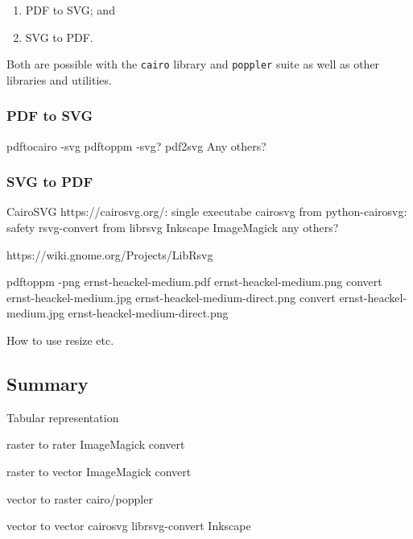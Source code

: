 \documentclass[
  11pt,
  british,
  a4paper,
]{article}
\newenvironment{Shaded}{\begin{snugshade}}{\end{snugshade}}
\newcommand{\AttributeTok}[1]{\textcolor[rgb]{0.80,0.80,0.80}{#1}}
\newcommand{\ExtensionTok}[1]{\textcolor[rgb]{0.80,0.80,0.80}{#1}}
\newcommand{\NormalTok}[1]{\textcolor[rgb]{0.80,0.80,0.80}{#1}}
\providecommand{\tightlist}{%
  \setlength{\itemsep}{0pt}\setlength{\parskip}{0pt}}
\begin{document}
\begin{enumerate}
\def\labelenumi{\alph{enumi}.}
\tightlist
\item
  PDF to SVG; and
\item
  SVG to PDF.
\end{enumerate}

Both are possible with the \texttt{cairo} library and \texttt{poppler}
suite as well as other libraries and utilities.

\hypertarget{pdf-to-svg}{%
\subsubsection{PDF to SVG}\label{pdf-to-svg}}

pdftocairo -svg pdftoppm -svg? pdf2svg Any others?

\hypertarget{svg-to-pdf}{%
\subsubsection{SVG to PDF}\label{svg-to-pdf}}

CairoSVG https://cairosvg.org/: single executabe cairosvg from
python-cairosvg: safety rsvg-convert from librsvg Inkscape ImageMagick
any others?

https://wiki.gnome.org/Projects/LibRsvg

\begin{Shaded}
\begin{Highlighting}[]
\ExtensionTok{pdftoppm} \AttributeTok{{-}png}\NormalTok{ ernst{-}heackel{-}medium.pdf ernst{-}heackel{-}medium.png}
\ExtensionTok{convert}\NormalTok{ ernst{-}heackel{-}medium.jpg ernst{-}heackel{-}medium{-}direct.png}
\ExtensionTok{convert}\NormalTok{ ernst{-}heackel{-}medium.jpg ernst{-}heackel{-}medium{-}direct.png}
\end{Highlighting}
\end{Shaded}

How to use resize etc.

\hypertarget{summary}{%
\subsection{Summary}\label{summary}}

Tabular representation

raster to rater ImageMagick convert

raster to vector ImageMagick convert

vector to raster cairo/poppler

vector to vector cairosvg librsvg-convert Inkscape
\end{document}
